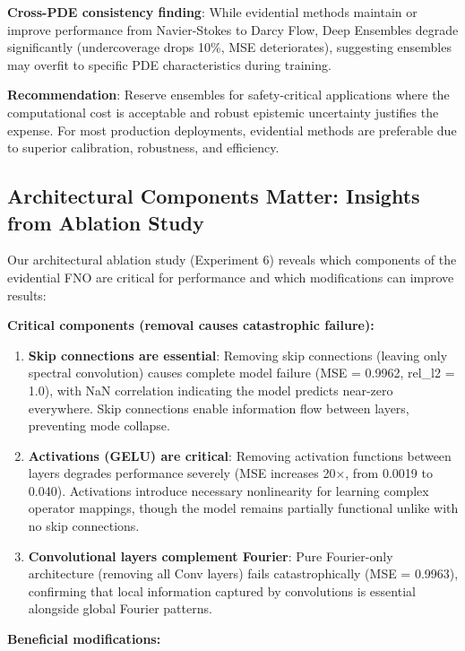 \textbf{Cross-PDE consistency finding}: While evidential methods maintain or improve performance from Navier-Stokes to Darcy Flow, Deep Ensembles degrade significantly (undercoverage drops 10\%, MSE deteriorates), suggesting ensembles may overfit to specific PDE characteristics during training.

\textbf{Recommendation}: Reserve ensembles for safety-critical applications where the computational cost is acceptable and robust epistemic uncertainty justifies the expense. For most production deployments, evidential methods are preferable due to superior calibration, robustness, and efficiency.

\subsection{Architectural Components Matter: Insights from Ablation Study}

Our architectural ablation study (Experiment 6) reveals which components of the evidential FNO are critical for performance and which modifications can improve results:

\textbf{Critical components (removal causes catastrophic failure):}

\begin{enumerate}
\item \textbf{Skip connections are essential}: Removing skip connections (leaving only spectral convolution) causes complete model failure (MSE = 0.9962, rel\_l2 = 1.0), with NaN correlation indicating the model predicts near-zero everywhere. Skip connections enable information flow between layers, preventing mode collapse.

\item \textbf{Activations (GELU) are critical}: Removing activation functions between layers degrades performance severely (MSE increases 20×, from 0.0019 to 0.040). Activations introduce necessary nonlinearity for learning complex operator mappings, though the model remains partially functional unlike with no skip connections.

\item \textbf{Convolutional layers complement Fourier}: Pure Fourier-only architecture (removing all Conv layers) fails catastrophically (MSE = 0.9963), confirming that local information captured by convolutions is essential alongside global Fourier patterns.
\end{enumerate}

\textbf{Beneficial modifications:}

